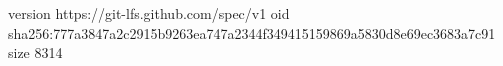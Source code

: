 version https://git-lfs.github.com/spec/v1
oid sha256:777a3847a2c2915b9263ea747a2344f349415159869a5830d8e69ec3683a7c91
size 8314
